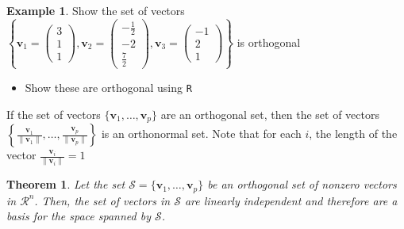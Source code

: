 \documentclass[
]{book}
\providecommand{\tightlist}{%
  \setlength{\itemsep}{0pt}\setlength{\parskip}{0pt}}
\newtheorem{theorem}{Theorem}[chapter]
\theoremstyle{definition}
\theoremstyle{definition}
\newtheorem{example}{Example}[chapter]
\theoremstyle{definition}
\theoremstyle{definition}
\theoremstyle{remark}
\begin{document}
\begin{example}

Show the set of vectors \(\left\{ \mathbf{v}_1 = \begin{pmatrix} 3 \\ 1 \\ 1 \end{pmatrix}, \mathbf{v}_2 = \begin{pmatrix} -\frac{1}{2} \\ -2 \\ \frac{7}{2} \end{pmatrix}, \mathbf{v}_3 = \begin{pmatrix} -1 \\ 2 \\ 1 \end{pmatrix} \right\}\) is orthogonal

\begin{itemize}
\tightlist
\item
  Show these are orthogonal using \texttt{R}
\end{itemize}

\end{example}

If the set of vectors \(\{ \mathbf{v}_1, \ldots, \mathbf{v}_p \}\) are an orthogonal set, then the set of vectors \(\left\{ \frac{\mathbf{v}_1}{\|\mathbf{v}_1\|}, \ldots, \frac{\mathbf{v}_p}{\|\mathbf{v}_p\|} \right\}\) is an orthonormal set. Note that for each \(i\), the length of the vector \(\frac{\mathbf{v}_i} {\|\mathbf{v}_i \|} = 1\)

\begin{theorem}
Let the set \(\mathcal{S} = \{ \mathbf{v}_1, \ldots, \mathbf{v}_p \}\) be an orthogonal set of nonzero vectors in \(\mathcal{R}^n\). Then, the set of vectors in \(\mathcal{S}\) are linearly independent and therefore are a basis for the space spanned by \(\mathcal{S}\).
\end{theorem}
\end{document}
